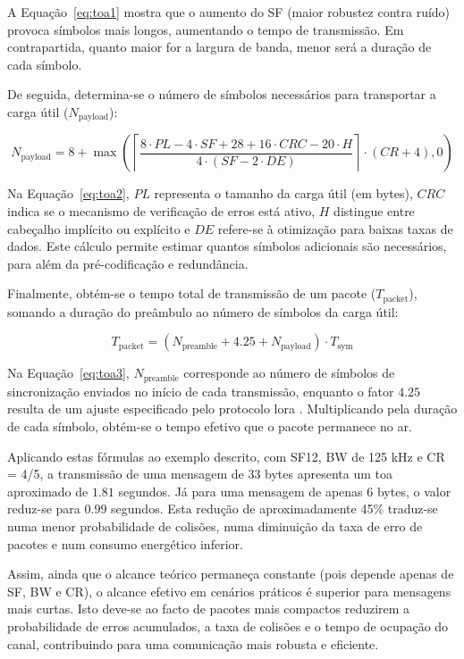 A Equação~\ref{eq:toa1} mostra que o aumento do SF (maior robustez contra ruído) provoca símbolos mais longos, aumentando o tempo de transmissão. Em contrapartida, quanto maior for a largura de banda, menor será a duração de cada símbolo.  

De seguida, determina-se o número de símbolos necessários para transportar a carga útil ($N_{\text{payload}}$):

\begin{equation}
N_{\text{payload}} = 8 + \max \left( \left\lceil \frac{8 \cdot PL - 4 \cdot SF + 28 + 16 \cdot CRC - 20 \cdot H}{4 \cdot (SF - 2 \cdot DE)} \right\rceil \cdot (CR+4), 0 \right)
\label{eq:toa2}
\end{equation}

Na Equação~\ref{eq:toa2}, $PL$ representa o tamanho da carga útil (em bytes), $CRC$ indica se o mecanismo de verificação de erros está ativo, $H$ distingue entre cabeçalho implícito ou explícito e $DE$ refere-se à otimização para baixas taxas de dados. Este cálculo permite estimar quantos símbolos adicionais são necessários, para além da pré-codificação e redundância.  

Finalmente, obtém-se o tempo total de transmissão de um pacote ($T_{\text{packet}}$), somando a duração do preâmbulo ao número de símbolos da carga útil:

\begin{equation}
T_{\text{packet}} = \left( N_{\text{preamble}} + 4.25 + N_{\text{payload}} \right) \cdot T_{\text{sym}}
\label{eq:toa3}
\end{equation}

Na Equação~\ref{eq:toa3}, $N_{\text{preamble}}$ corresponde ao número de símbolos de sincronização enviados no início de cada transmissão, enquanto o fator $4.25$ resulta de um ajuste especificado pelo protocolo \gls{lora} \cite{ttn-lora-phy-format}. Multiplicando pela duração de cada símbolo, obtém-se o tempo efetivo que o pacote permanece no ar.  

Aplicando estas fórmulas ao exemplo descrito, com SF12, BW de 125 kHz e CR = 4/5, a transmissão de uma mensagem de 33 bytes apresenta um \gls{toa} aproximado de $1.81$ segundos. Já para uma mensagem de apenas 6 bytes, o valor reduz-se para $0.99$ segundos. Esta redução de aproximadamente 45\% traduz-se numa menor probabilidade de colisões, numa diminuição da taxa de erro de pacotes e num consumo energético inferior.  

Assim, ainda que o alcance teórico permaneça constante (pois depende apenas de SF, BW e CR), o alcance efetivo em cenários práticos é superior para mensagens mais curtas. Isto deve-se ao facto de pacotes mais compactos reduzirem a probabilidade de erros acumulados, a taxa de colisões e o tempo de ocupação do canal, contribuindo para uma comunicação mais robusta e eficiente.

